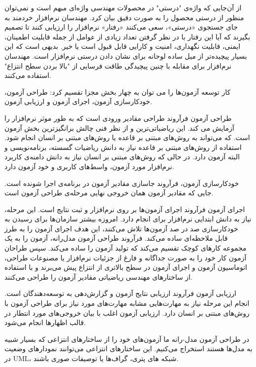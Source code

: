 از آن‌جایی که واژه‌ی "درستی" در محصولات مهندسی واژه‌ای مبهم است و نمی‌توان منظور از درستی محصول را به صورت دقیق بیان کرد. مهندسان نرم‌افزار خردمند به جای جستجوی «درستی»، سعی می‌کنند «رفتار» نرم‌افزار را ارزیابی کنند تا تصمیم بگیرند که آیا این رفتار با در نظر گرفتن تعداد زیادی از عوامل از جمله قابلیت اطمینان، ایمنی، قابلیت نگهداری، امنیت و کارایی قابل قبول است یا خیر. بدیهی است که این بسیار پیچیده‌تر از میل ساده لوحانه برای نشان دادن درستی نرم‌افزار است. مهندسان نرم‌افزار برای مقابله با چنین پیچیدگی طاقت فرسایی از "بالا بردن سطح انتزاع" استفاده می‌کنند.
 
کار توسعه آزمون‌ها را می توان به چهار بخش مجزا تقسیم کرد: طراحی آزمون، خودکارسازی آزمون، اجرای آزمون و ارزیابی آزمون.


 طراحی آزمون فرآروند طراحی مقادیر ورودی است که به طور موثر نرم‌افزار را آزمایش می کند. این ریاضیاتی‌ترین و از نظر فنی چالش برانگیزترین بخش آزمون است. که می‌تواند به روش‌های مبتنی بر قاعده یا روش‌های مبتنی بر انسان انجام شود. استفاده از روش‌های مبتنی بر قاعده نیاز به دانش ریاضیات گسسته، برنامه‌نویسی و البته آزمون دارد. در حالی که روش‌های مبتنی بر انسان نیاز به دانش دامنه‌ی کاربرد نرم‌افزار مورد آزمون، واسط‌های کاربری و خود آزمون دارد.

 خودکارسازی آزمون، فرآروند جاسازی مقادیر آزمون در برنامه‌ی اجرا شونده است. جایی که مقادیر آزمون همان خروجی نهایی مرحله‌ی طراحی آزمون است.

 اجرای آزمون فرآروند اجرای آزمون‌ها بر روی نرم‌افزار و ثبت نتایج است. این مرحله، نیاز به دانش ابتدایی نرم‌افزار برای انجام دارد. امروزه بیشتر سازمان‌ها برای رسیدن به خودکارسازی صد در صد آزمون‌ها تلاش می‌کنند، این هدف اجرای آزمون‌ را به طرز قابل ملاحظه‌ای ساده می‌کند.
فرآروند طراحی آزمون مدل‌رانه، آزمون را به یک مجموعه کارهای کوچک تقسیم می‌کند که تولید آزمون را ساده می‌کند. سپس طراحان آزمون کار خود را به صورت جداگانه و فارغ از جزئیات نرم‌افزار یا مصنوعات طراحی، اتوماسیون آزمون و اجرای آزمون در سطح بالاتری از انتزاع پیش می‌برند و با استفاده از ساختارهای مهندسی ریاضیاتی مقادیر آزمون را طراحی می‌کنند. 

 ارزیابی آزمون فرآروند ارزیابی نتایج آزمون و گزارش‌دهی به توسعه‌دهندگان است. انجام این مرحله نیاز به مهارت‌هایی مشابه مهارت‌های مورد نیاز برای طراحی آزمون با روش‌های مبتنی بر انسان دارد. ارزیابی آزمون اغلب با بیان خروجی‌های مورد انتطار در قالب  اظهارها انجام می‌شود.

در طراحی آزمون مدل-رانه ما آزمون‌های خود را از ساختارهای انتزاعی که بسیار شبیه به مدل‌ها هستند استخراج می‌کنیم. این ساختارهای انتزاعی می‌توانند نمودارهای وضعیت در UML، شبکه های پتری، گراف‌ها یا توصیفات صوری باشند. 

